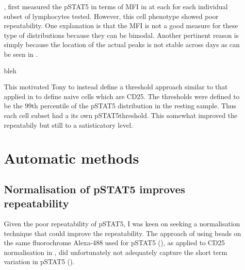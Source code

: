 , first measured the pSTAT5 in terms of \gls{MFI}
in at each for each individual subset of lymphocytes tested.
However, this cell phenotype showed poor repeatability.
One explanation is that the \gls{MFI} is not a good measure for these type of distributions because they can be bimodal.
Another pertinent reason is simply because the location of the actual peaks is not stable across days as can be seen in 
.

 { bleh }

This motivated Tony to instead define a threshold approach similar to that applied in  to define naive cells which are CD25\positive.
The thresholds were defined to be the 99th percentile of the pSTAT5 distribution in the resting sample.
Thus each cell subset had a its own pSTAT5\positive threshold.
This somewhat improved the repeatabily but still to a satisticatory level.


\section{Automatic methods}

\subsection{Normalisation of pSTAT5 improves repeatability}



Given the poor repeatability of pSTAT5, I was keen on seeking a normalisation technique that could improve the repeatability.
The approach of using beads on the same fluorochrome Alexa-488 used for pSTAT5 (),
as applied to CD25 normalisation in ,
did unfortunately not adequately capture the short term variation in pSTAT5 ().

